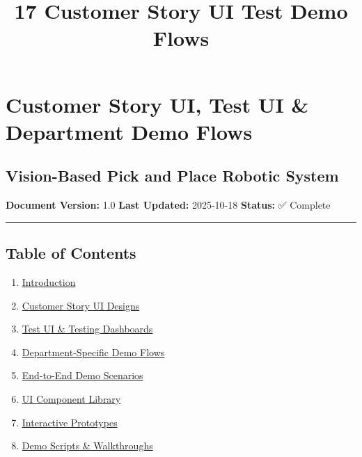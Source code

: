 \documentclass[
]{article}
\title{17 Customer Story UI Test Demo Flows}
\author{}
\date{}
\providecommand{\tightlist}{%
  \setlength{\itemsep}{0pt}\setlength{\parskip}{0pt}}
\begin{document}
\maketitle

{
\setcounter{tocdepth}{3}
\tableofcontents
}
\hypertarget{customer-story-ui-test-ui-department-demo-flows}{%
\section{Customer Story UI, Test UI \& Department Demo
Flows}\label{customer-story-ui-test-ui-department-demo-flows}}

\hypertarget{vision-based-pick-and-place-robotic-system}{%
\subsection{Vision-Based Pick and Place Robotic
System}\label{vision-based-pick-and-place-robotic-system}}

\textbf{Document Version:} 1.0 \textbf{Last Updated:} 2025-10-18
\textbf{Status:} ✅ Complete

\begin{center}\rule{0.5\linewidth}{0.5pt}\end{center}

\hypertarget{table-of-contents}{%
\subsection{Table of Contents}\label{table-of-contents}}

\begin{enumerate}
\def\labelenumi{\arabic{enumi}.}
\tightlist
\item
  \protect\hyperlink{1-introduction}{Introduction}
\item
  \protect\hyperlink{2-customer-story-ui-designs}{Customer Story UI
  Designs}
\item
  \protect\hyperlink{3-test-ui--testing-dashboards}{Test UI \& Testing
  Dashboards}
\item
  \protect\hyperlink{4-department-specific-demo-flows}{Department-Specific
  Demo Flows}
\item
  \protect\hyperlink{5-end-to-end-demo-scenarios}{End-to-End Demo
  Scenarios}
\item
  \protect\hyperlink{6-ui-component-library}{UI Component Library}
\item
  \protect\hyperlink{7-interactive-prototypes}{Interactive Prototypes}
\item
  \protect\hyperlink{8-demo-scripts--walkthroughs}{Demo Scripts \&
  Walkthroughs}
\end{enumerate}
\end{document}
